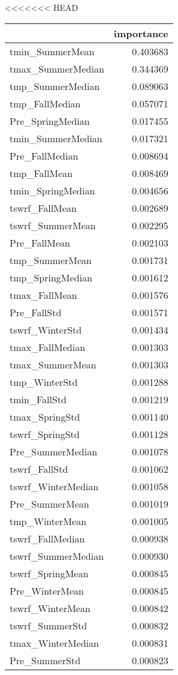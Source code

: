<<<<<<< HEAD
\begin{tabular}{lr}
\toprule
 & importance \\
\midrule
tmin_SummerMean & 0.403683 \\
tmax_SummerMedian & 0.344369 \\
tmp_SummerMedian & 0.089063 \\
tmp_FallMedian & 0.057071 \\
Pre_SpringMedian & 0.017455 \\
tmin_SummerMedian & 0.017321 \\
Pre_FallMedian & 0.008694 \\
tmp_FallMean & 0.008469 \\
tmin_SpringMedian & 0.004656 \\
tswrf_FallMean & 0.002689 \\
tswrf_SummerMean & 0.002295 \\
Pre_FallMean & 0.002103 \\
tmp_SummerMean & 0.001731 \\
tmp_SpringMedian & 0.001612 \\
tmax_FallMean & 0.001576 \\
Pre_FallStd & 0.001571 \\
tswrf_WinterStd & 0.001434 \\
tmax_FallMedian & 0.001303 \\
tmax_SummerMean & 0.001303 \\
tmp_WinterStd & 0.001288 \\
tmin_FallStd & 0.001219 \\
tmax_SpringStd & 0.001140 \\
tswrf_SpringStd & 0.001128 \\
Pre_SummerMedian & 0.001078 \\
tswrf_FallStd & 0.001062 \\
tswrf_WinterMedian & 0.001058 \\
Pre_SummerMean & 0.001019 \\
tmp_WinterMean & 0.001005 \\
tswrf_FallMedian & 0.000938 \\
tswrf_SummerMedian & 0.000930 \\
tswrf_SpringMean & 0.000845 \\
Pre_WinterMean & 0.000845 \\
tswrf_WinterMean & 0.000842 \\
tswrf_SummerStd & 0.000832 \\
tmax_WinterMedian & 0.000831 \\
Pre_SummerStd & 0.000823 \\

\end{tabular}
